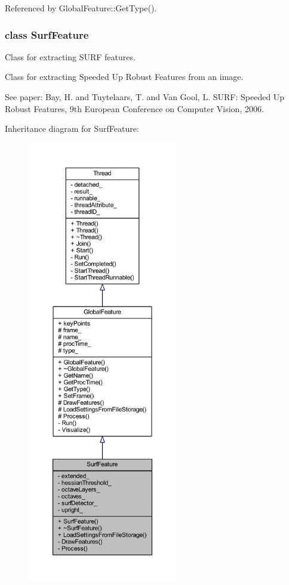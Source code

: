 Referenced by Global\-Feature\-::\-Get\-Type().

\label{class_surf_feature}
\hypertarget{group___feature_extractor_class_surf_feature}{}
\subsubsection{class Surf\-Feature}
Class for extracting S\-U\-R\-F features. 

Class for extracting Speeded Up Robust Features from an image.

See paper\-: Bay, H. and Tuytelaars, T. and Van Gool, L. \-S\-U\-R\-F\-: Speeded Up Robust Features, 9th European Conference on Computer Vision, 2006. 

Inheritance diagram for Surf\-Feature\-:
\nopagebreak
\begin{figure}[H]
\begin{center}
\leavevmode
\includegraphics[height=550pt]{class_surf_feature__inherit__graph}
\end{center}
\end{figure}


